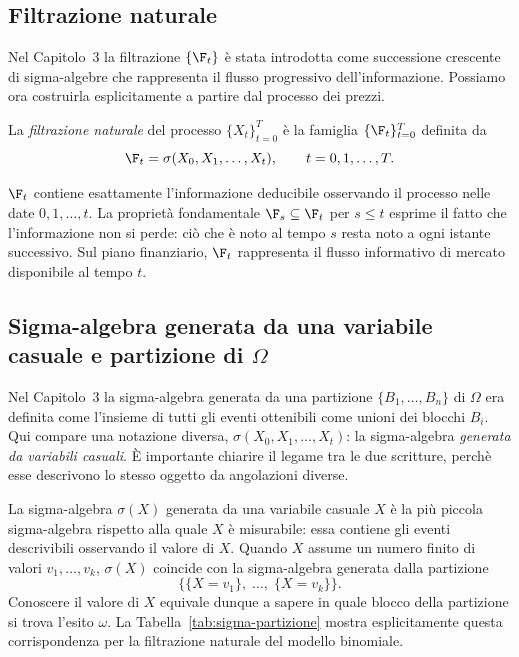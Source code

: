 \subsection{Filtrazione naturale}

\noindent
Nel Capitolo~3 la filtrazione $\{\F_t\}$ \`{e} stata introdotta come
successione crescente di sigma-algebre che rappresenta il flusso
progressivo dell'informazione. Possiamo ora costruirla esplicitamente
a partire dal processo dei prezzi.

\begin{definition}
\label{def:filtrazione-naturale}
La \emph{filtrazione naturale} del processo $\{X_t\}_{t=0}^{T}$ \`{e}
la famiglia $\{\F_t\}_{t=0}^{T}$ definita da
\[
\F_t=\sigma(X_0,X_1,\ldots,X_t), \qquad t=0,1,\ldots,T.
\]
\end{definition}

$\F_t$ contiene esattamente l'informazione deducibile osservando il
processo nelle date $0,1,\ldots,t$. La propriet\`{a} fondamentale
$\F_s\subseteq\F_t$ per $s\leq t$ esprime il fatto che l'informazione
non si perde: ci\`{o} che \`{e} noto al tempo $s$ resta noto a ogni
istante successivo. Sul piano finanziario, $\F_t$ rappresenta il
flusso informativo di mercato disponibile al tempo $t$.

\subsection{Sigma-algebra generata da una variabile casuale e
partizione di $\Omega$}

\noindent
Nel Capitolo~3 la sigma-algebra generata da una partizione
$\{B_1,\ldots,B_n\}$ di $\Omega$ era definita come l'insieme di tutti
gli eventi ottenibili come unioni dei blocchi $B_i$. Qui compare una
notazione diversa, $\sigma(X_0,X_1,\ldots,X_t)$: la sigma-algebra
\emph{generata da variabili casuali}. \`{E} importante chiarire il
legame tra le due scritture, perch\`{e} esse descrivono lo stesso
oggetto da angolazioni diverse.

La sigma-algebra $\sigma(X)$ generata da una variabile casuale $X$
\`{e} la pi\`{u} piccola sigma-algebra rispetto alla quale $X$ \`{e}
misurabile: essa contiene gli eventi descrivibili osservando il valore
di $X$. Quando $X$ assume un numero finito di valori $v_1,\ldots,v_k$,
$\sigma(X)$ coincide con la sigma-algebra generata dalla partizione
\[
\bigl\{\{X=v_1\},\;\ldots,\;\{X=v_k\}\bigr\}.
\]
Conoscere il valore di $X$ equivale dunque a sapere in quale blocco
della partizione si trova l'esito $\omega$. La
Tabella~\ref{tab:sigma-partizione} mostra esplicitamente questa
corrispondenza per la filtrazione naturale del modello binomiale.

